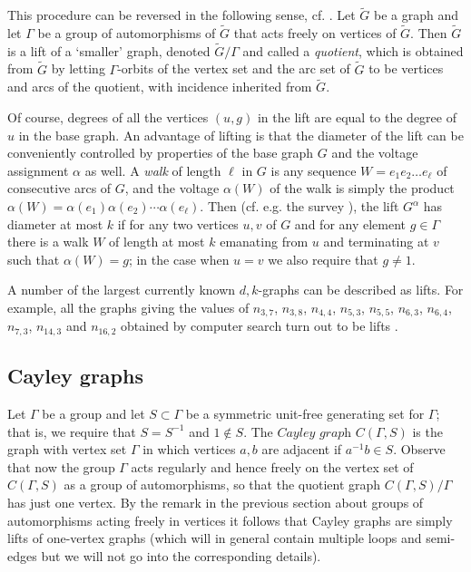 \documentclass[a4paper,12pt,oneside]{report}%
\begin{document}

This procedure can be reversed in the following sense, cf. \cite{Gro-Tuc}. Let $\tilde G$ be a graph and let $\Gamma$ be a group of automorphisms of $\tilde G$ that acts freely on vertices of $\tilde G$. Then $\tilde G$ is a lift of a `smaller' graph, denoted $\tilde G/\Gamma$ and called a {\em quotient}, which is obtained from $\tilde G$ by letting $\Gamma$-orbits of the vertex set and the arc set of $\tilde G$ to be vertices and arcs of the quotient, with incidence inherited from $\tilde G$.
\medskip

Of course, degrees of all the vertices $(u,g)$ in the lift are equal to the degree of $u$ in the base graph. An advantage of lifting is that the diameter of the lift can be conveniently controlled by properties of the base graph $G$ and the voltage assignment $\alpha$ as well. A {\em walk} of length $\ell$ in $G$ is any sequence  $W=e_1e_2\ldots e_{\ell}$ of consecutive arcs of $G$, and the voltage $\alpha(W)$ of the walk is simply the product $\alpha(W)=\alpha(e_1)\alpha(e_2)\cdots \alpha(e_{\ell})$. Then (cf. e.g. the survey \cite{Mil-Sir}), the lift $G^{\alpha}$ has diameter at most $k$ if for any two vertices $u,v$ of $G$ and for any element $g\in \Gamma$ there is a walk $W$ of length at most $k$ emanating from $u$ and terminating at $v$ such that $\alpha(W)=g$; in the case when $u=v$ we also require that $g\ne 1$.
\medskip

A number of the largest currently known ${d,k}$-graphs can be described as lifts. For example, all the graphs giving the values of $n_{3,7}$, $n_{3,8}$, $n_{4,4}$, $n_{5,3}$, $n_{5,5}$, $n_{6,3}$, $n_{6,4}$, $n_{7,3}$, $n_{14, 3}$ and $n_{16,2}$ obtained by computer search turn out to be lifts \cite{Mil-Sir}.


\subsection{Cayley graphs}
Let $\Gamma$ be a group and let $S\subset \Gamma$ be a symmetric unit-free generating set for $\Gamma$; that is, we require that $S=S^{-1}$ and $1\notin S$. The $\textit{Cayley graph}$ $C(\Gamma,S)$ is the graph with vertex set $\Gamma$ in which vertices $a,b$ are adjacent if $a^{-1}b\in S$. Observe that now the group $\Gamma$ acts regularly and hence freely on the vertex set of $C(\Gamma,S)$ as a group of automorphisms, so that the quotient graph $C(\Gamma,S)/\Gamma$ has just one vertex. By the remark in the previous section about groups of automorphisms acting freely in vertices it follows that Cayley graphs are simply lifts of one-vertex graphs (which will in general contain multiple loops and semi-edges but we will not go into the corresponding details).
\medskip
\end{document}
